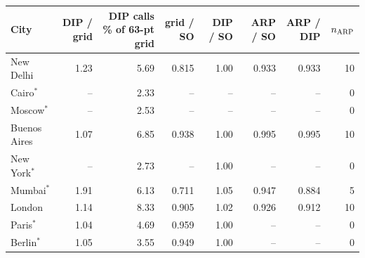 \begin{tabular}{lrrrrrrr}
\toprule
City & DIP / grid & DIP calls \% of 63-pt grid & grid / SO & DIP / SO & ARP / SO & ARP / DIP & $n_{\rm ARP}$ \\
\midrule
New Delhi & 1.23 & 5.69 & 0.815 & 1.00 & 0.933 & 0.933 & 10 \\
Cairo$^*$ & -- & 2.33 & -- & -- & -- & -- & 0 \\
Moscow$^*$ & -- & 2.53 & -- & -- & -- & -- & 0 \\
Buenos Aires & 1.07 & 6.85 & 0.938 & 1.00 & 0.995 & 0.995 & 10 \\
New York$^*$ & -- & 2.73 & -- & 1.00 & -- & -- & 0 \\
Mumbai$^*$ & 1.91 & 6.13 & 0.711 & 1.05 & 0.947 & 0.884 & 5 \\
London & 1.14 & 8.33 & 0.905 & 1.02 & 0.926 & 0.912 & 10 \\
Paris$^*$ & 1.04 & 4.69 & 0.959 & 1.00 & -- & -- & 0 \\
Berlin$^*$ & 1.05 & 3.55 & 0.949 & 1.00 & -- & -- & 0 \\
\bottomrule
\end{tabular}
